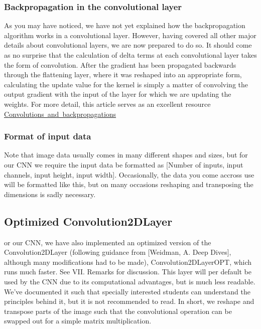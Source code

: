 \documentclass[onecolumn,10pt,cleanfoot]{asme2ej}
\begin{document}
\subsubsection{Backpropagation in the convolutional layer}
As you may have noticed, we have not yet explained how the backpropagation algorithm works in a convolutional layer. However, having covered all other major details about convolutional layers, we are now prepared to do so. It should come as no surprise that the calculation of delta terms at each convolutional layer takes the form of convolution. After the gradient has been propagated backwards through the flattening layer, where it was reshaped into an appropriate form, calculating the update value for the kernel is simply a matter of convolving the output gradient with the input of the layer for which we are updating the weights. For more detail, this article serves as an excellent resource \href{https://pavisj.medium.com/convolutions-and-backpropagations-46026a8f5d2c}{\color{blue}Convolutions\ and\ backpropagations}

\subsubsection{Format of input data}
Note that image data usually comes in many different shapes and sizes, but for our CNN we require the input data be formatted as [Number of inputs, input channels, input height, input width]. Occasionally, the data you come accross use will be formatted like this, but on many occasions reshaping and transposing the dimensions is sadly necessary.

\subsection{Optimized Convolution2DLayer}
or our CNN, we have also implemented an optimized version of the Convolution2DLayer (following guidance from [Weidman, A. Deep Dives], although many modifications had to be made), Convolution2DLayerOPT, which runs much faster. See VII. Remarks for discussion. This layer will per default be used by the CNN due to its computational advantages, but is much less readable. We've documented it such that specially interested students can understand the principles behind it, but it is not recommended to read. In short, we reshape and transpose parts of the image such that the convolutional operation can be swapped out for a simple matrix multiplication.
\end{document}
